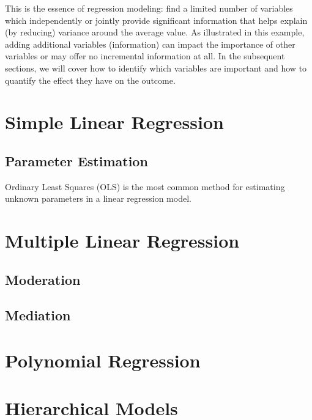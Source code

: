 \documentclass[]{book}
\begin{document}
This is the essence of regression modeling: find a limited number of variables which independently or jointly provide significant information that helps explain (by reducing) variance around the average value. As illustrated in this example, adding additional variables (information) can impact the importance of other variables or may offer no incremental information at all. In the subsequent sections, we will cover how to identify which variables are important and how to quantify the effect they have on the outcome.

\hypertarget{simple-linear-regression}{%
\section{Simple Linear Regression}\label{simple-linear-regression}}

\hypertarget{parameter-estimation}{%
\subsection{Parameter Estimation}\label{parameter-estimation}}

Ordinary Least Squares (OLS) is the most common method for estimating unknown parameters in a linear regression model.

\hypertarget{multiple-linear-regression}{%
\section{Multiple Linear Regression}\label{multiple-linear-regression}}

\hypertarget{moderation}{%
\subsection{Moderation}\label{moderation}}

\hypertarget{mediation}{%
\subsection{Mediation}\label{mediation}}

\hypertarget{polynomial-regression}{%
\section{Polynomial Regression}\label{polynomial-regression}}

\hypertarget{hierarchical-models}{%
\section{Hierarchical Models}\label{hierarchical-models}}
\end{document}
